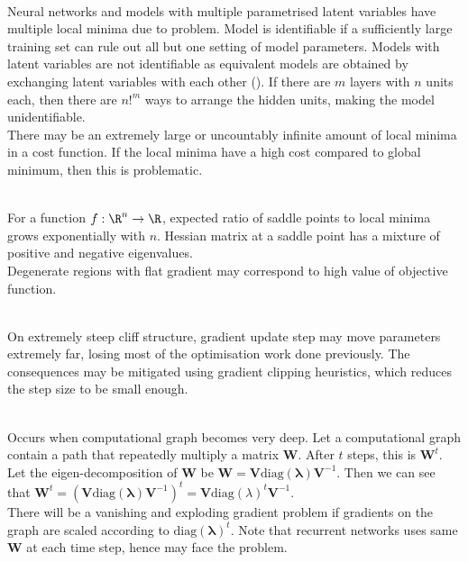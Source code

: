 \begin{remark} \\
Neural networks and models with multiple parametrised latent variables have multiple local minima due to  problem. Model is identifiable if a sufficiently large training set can rule out all but one setting of model parameters. Models with latent variables are not identifiable as equivalent models are obtained by exchanging latent variables with each other (). If there are $m$ layers with $n$ units each, then there are $n!^m$ ways to arrange the hidden units, making the model unidentifiable.\\
There may be an extremely large or uncountably infinite amount of local minima in a cost function. If the local minima have a high cost compared to global minimum, then this is problematic.
\end{remark}

\begin{remark} \\
For a function $f: \R^n \rightarrow \R$, expected ratio of saddle points to local minima grows exponentially with $n$. Hessian matrix at a saddle point has a mixture of positive and negative eigenvalues.\\
Degenerate regions with flat gradient may correspond to high value of objective function.
\end{remark}

\begin{remark} \\
On extremely steep cliff structure, gradient update step may move parameters extremely far, losing most of the optimisation work done previously. The consequences may be mitigated using gradient clipping heuristics, which reduces the step size to be small enough.
\end{remark}

\begin{remark} \\
Occurs when computational graph becomes very deep. Let a computational graph contain a path that repeatedly multiply a matrix $\bm{W}$. After $t$ steps, this is $\bm{W}^t$. Let the eigen-decomposition of $\bm{W}$ be $\bm{W} = \bm{V} \text{diag}(\bm{\lambda}) \bm{V}^{-1}$. Then we can see that $\bm{W}^t = (\bm{V} \text{diag}(\bm{\lambda}) \bm{V}^{-1})^t = \bm{V} \text{diag}(\lambda)^t \bm{V}^{-1}$.\\
There will be a vanishing and exploding gradient problem if gradients on the graph are scaled according to $\text{diag}(\bm{\lambda})^t$.  Note that recurrent networks uses same $\bm{W}$ at each time step, hence may face the problem.
\end{remark}

